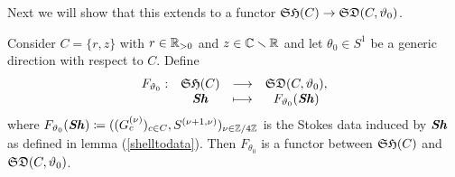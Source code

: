 Next we will show that this extends to a functor $\mathfrak{SH}(C) \to \mathfrak{SD}(C,\vartheta_0)$.


\begin{prop}\label{F-functor}
    Consider $C=\{r,z\}$ with $r \in \mathbb{R}_{>0}$ and $z \in \mathbb{C}\smallsetminus \mathbb{R}$ and let $\theta_0 \in S^1$ be a generic direction with respect to $C$. Define 
    \[
    \begin{matrix}
        F_{\vartheta_0}: & \mathfrak{SH}(C) &\longrightarrow & \mathfrak{SD}(C,\vartheta_0), \\
        & \bm{\mathit{Sh}} &\longmapsto & F_{\vartheta_0}(\bm{\mathit{Sh}})
    \end{matrix}
    \]
    where $F_{\vartheta_0}(\bm{\mathit{Sh}}) \coloneqq ((G_c^{(\nu)})_{c \in C}, S^{(\nu+1,\nu)})_{\nu \in \mathbb{Z}/4\mathbb{Z}}$ is the Stokes data induced by $\bm{\mathit{Sh}}$ as defined in lemma (\ref{shelltodata}). Then $F_{\theta_0}$ is a functor between $\mathfrak{SH}(C)$ and $\mathfrak{SD}(C,\vartheta_0)$.
\end{prop}

